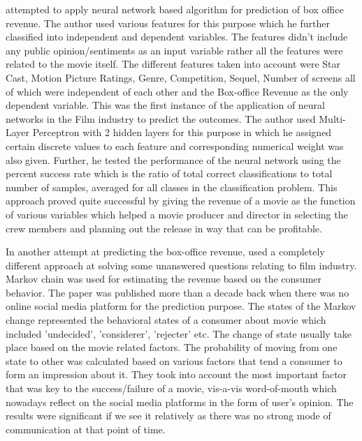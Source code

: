 \citet{sharda2006predicting} attempted to apply neural network based algorithm for prediction of box office revenue. The author used various features for this purpose which he further classified into independent and dependent variables. The features didn't include any public opinion/sentiments as an input variable rather all the features were related to the movie itself. The different features taken into account were Star Cast, Motion Picture Ratings, Genre, Competition, Sequel, Number of screens all of which were independent of each other and the Box-office Revenue as the only dependent variable. This was the first instance of the application of neural networks in the Film industry to predict the outcomes. The author used Multi-Layer Perceptron with 2 hidden layers for this purpose in which he assigned certain discrete values to each feature and corresponding numerical weight was also given. Further, he tested the performance of the neural network using the percent success rate which is the ratio of total correct classifications to total number of samples, averaged for all classes in the classification problem. This approach proved quite successful by giving the revenue of a movie as the function of various variables which helped a movie producer and director in selecting the crew members and planning out the release in way that can be profitable.

In another attempt at predicting the box-office revenue, \citet{moviemod} used a completely different approach at solving some unanswered questions relating to film industry. Markov chain was used for estimating the revenue based on the consumer behavior. The paper was published more than a decade back when there was no online social media platform for the prediction purpose. The states of the Markov change represented the behavioral states of a consumer about movie which included 'undecided', 'considerer', 'rejecter' etc. The change of state usually take place based on the movie related factors. The probability of moving from one state to other was calculated based on various factors that tend a consumer to form an impression about it. They took into account the most important factor that was key to the success/failure of a movie, vis-a-vis word-of-mouth which nowadays reflect on the social media platforms in the form of user's opinion. The results were significant if we see it relatively as there was no strong mode of communication at that point of time. 